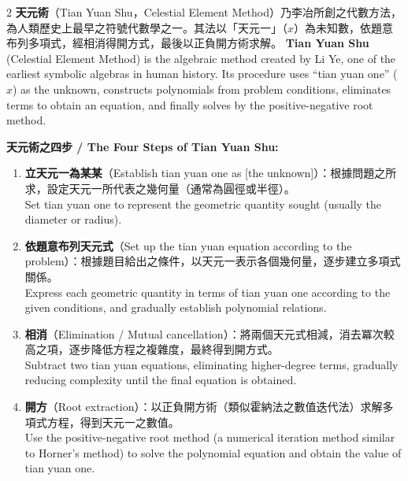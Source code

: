 \documentclass[11pt,a4paper]{article}
\begin{document}
\begin{paracol}{2}
\textbf{天元術}（Tian Yuan Shu，Celestial Element Method）乃李冶所創之代數方法，為人類歷史上最早之符號代數學之一。其法以「天元一」（$x$）為未知數，依題意布列多項式，經相消得開方式，最後以正負開方術求解。
\switchcolumn
\textbf{Tian Yuan Shu} (Celestial Element Method) is the algebraic method created by Li Ye, one of the earliest symbolic algebras in human history. Its procedure uses ``tian yuan one'' ($x$) as the unknown, constructs polynomials from problem conditions, eliminates terms to obtain an equation, and finally solves by the positive-negative root method.
\end{paracol}

\vspace{0.3cm}

\textbf{天元術之四步 / The Four Steps of Tian Yuan Shu:}

\begin{enumerate}[leftmargin=2em]
  \item \textbf{立天元一為某某}（Establish tian yuan one as [the unknown]）：根據問題之所求，設定天元一所代表之幾何量（通常為圓徑或半徑）。\\Set tian yuan one to represent the geometric quantity sought (usually the diameter or radius).

  \item \textbf{依題意布列天元式}（Set up the tian yuan equation according to the problem）：根據題目給出之條件，以天元一表示各個幾何量，逐步建立多項式關係。\\Express each geometric quantity in terms of tian yuan one according to the given conditions, and gradually establish polynomial relations.

  \item \textbf{相消}（Elimination / Mutual cancellation）：將兩個天元式相減，消去冪次較高之項，逐步降低方程之複雜度，最終得到開方式。\\Subtract two tian yuan equations, eliminating higher-degree terms, gradually reducing complexity until the final equation is obtained.

  \item \textbf{開方}（Root extraction）：以正負開方術（類似霍納法之數值迭代法）求解多項式方程，得到天元一之數值。\\Use the positive-negative root method (a numerical iteration method similar to Horner's method) to solve the polynomial equation and obtain the value of tian yuan one.
\end{enumerate}
\end{document}
